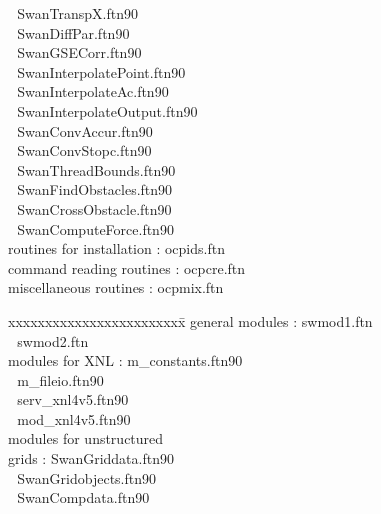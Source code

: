 \documentclass[12pt]{book}
\begin{document}
\begin{tabbing}
                          \> $\,\,$ SwanTranspX.ftn90 \\
                          \> $\,\,$ SwanDiffPar.ftn90 \\
                          \> $\,\,$ SwanGSECorr.ftn90 \\
                          \> $\,\,$ SwanInterpolatePoint.ftn90 \\
                          \> $\,\,$ SwanInterpolateAc.ftn90 \\
                          \> $\,\,$ SwanInterpolateOutput.ftn90 \\
                          \> $\,\,$ SwanConvAccur.ftn90 \\
                          \> $\,\,$ SwanConvStopc.ftn90 \\
                          \> $\,\,$ SwanThreadBounds.ftn90 \\
                          \> $\,\,$ SwanFindObstacles.ftn90 \\
                          \> $\,\,$ SwanCrossObstacle.ftn90 \\
                          \> $\,\,$ SwanComputeForce.ftn90 \\
routines for installation \>:       ocpids.ftn \\
command reading routines  \>:       ocpcre.ftn \\
miscellaneous routines    \>:       ocpmix.ftn \\
\end{tabbing}
\newpage
\begin{tabbing}
xxxxxxxxxxxxxxxxxxxxxxxx\= \kill
general modules           \>:       swmod1.ftn \\
                          \> $\,\,$ swmod2.ftn \\
modules for XNL           \>:       m\_constants.ftn90 \\
                          \> $\,\,$ m\_fileio.ftn90 \\
                          \> $\,\,$ serv\_xnl4v5.ftn90 \\
                          \> $\,\,$ mod\_xnl4v5.ftn90 \\
modules for unstructured  \> $\,\,$ \\
grids                     \>:       SwanGriddata.ftn90 \\
                          \> $\,\,$ SwanGridobjects.ftn90 \\
                          \> $\,\,$ SwanCompdata.ftn90 \\
\end{tabbing}
\end{document}
